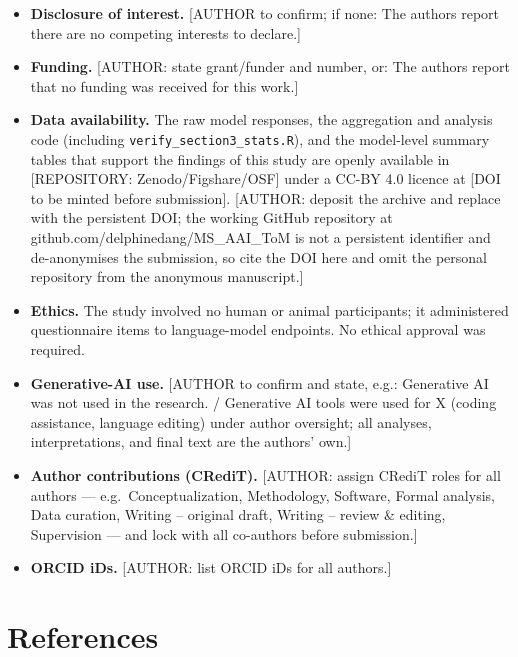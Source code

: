 \documentclass[
]{article}
\newcounter{none} %
\providecommand{\tightlist}{%
  \setlength{\itemsep}{0pt}\setlength{\parskip}{0pt}}
\begin{document}
\begin{itemize}
\tightlist
\item
  \textbf{Disclosure of interest.} {[}AUTHOR to confirm; if none: The
  authors report there are no competing interests to declare.{]}
\item
  \textbf{Funding.} {[}AUTHOR: state grant/funder and number, or: The
  authors report that no funding was received for this work.{]}
\item
  \textbf{Data availability.} The raw model responses, the aggregation
  and analysis code (including \texttt{verify\_section3\_stats.R}), and
  the model-level summary tables that support the findings of this study
  are openly available in {[}REPOSITORY: Zenodo/Figshare/OSF{]} under a
  CC-BY 4.0 licence at {[}DOI to be minted before submission{]}.
  {[}AUTHOR: deposit the archive and replace with the persistent DOI;
  the working GitHub repository at github.com/delphinedang/MS\_AAI\_ToM
  is not a persistent identifier and de-anonymises the submission, so
  cite the DOI here and omit the personal repository from the anonymous
  manuscript.{]}
\item
  \textbf{Ethics.} The study involved no human or animal participants;
  it administered questionnaire items to language-model endpoints. No
  ethical approval was required.
\item
  \textbf{Generative-AI use.} {[}AUTHOR to confirm and state, e.g.:
  Generative AI was not used in the research. / Generative AI tools were
  used for X (coding assistance, language editing) under author
  oversight; all analyses, interpretations, and final text are the
  authors' own.{]}
\item
  \textbf{Author contributions (CRediT).} {[}AUTHOR: assign CRediT roles
  for all authors --- e.g.~Conceptualization, Methodology, Software,
  Formal analysis, Data curation, Writing -- original draft, Writing --
  review \& editing, Supervision --- and lock with all co-authors before
  submission.{]}
\item
  \textbf{ORCID iDs.} {[}AUTHOR: list ORCID iDs for all authors.{]}
\end{itemize}

\section*{References}\label{references}
\end{document}
